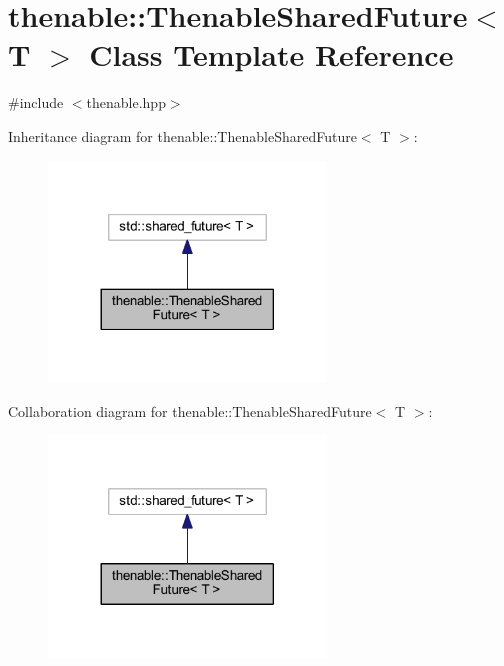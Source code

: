 \hypertarget{classthenable_1_1_thenable_shared_future}{}\section{thenable\+:\+:Thenable\+Shared\+Future$<$ T $>$ Class Template Reference}
\label{classthenable_1_1_thenable_shared_future}


{\ttfamily \#include $<$thenable.\+hpp$>$}



Inheritance diagram for thenable\+:\+:Thenable\+Shared\+Future$<$ T $>$\+:\nopagebreak
\begin{figure}[H]
\begin{center}
\leavevmode
\includegraphics[width=209pt]{classthenable_1_1_thenable_shared_future__inherit__graph}
\end{center}
\end{figure}


Collaboration diagram for thenable\+:\+:Thenable\+Shared\+Future$<$ T $>$\+:\nopagebreak
\begin{figure}[H]
\begin{center}
\leavevmode
\includegraphics[width=209pt]{classthenable_1_1_thenable_shared_future__coll__graph}
\end{center}
\end{figure}
